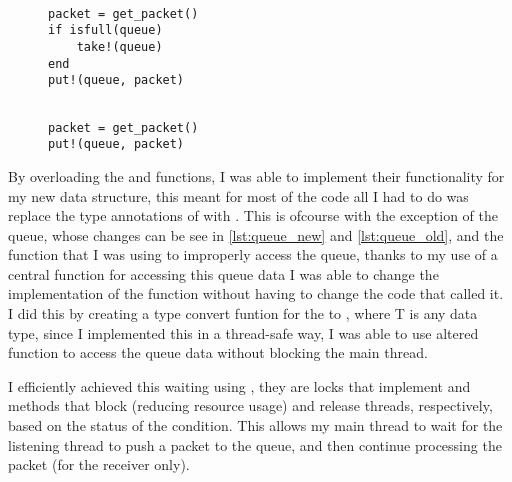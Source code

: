 \begin{figure}[!h]
    \begin{minipage}{0.5\textwidth}
        \centering
        \begin{verbatim}

packet = get_packet()
if isfull(queue)
    take!(queue)
end
put!(queue, packet)

        \end{verbatim}
    \end{minipage}
    \begin{minipage}{0.5\textwidth}
        \centering
        \begin{verbatim}

packet = get_packet()
put!(queue, packet)

        \end{verbatim}
    \end{minipage}
\label{lst:queue_impl_comparison}
\end{figure}

By overloading the  and  functions, I was able to implement their functionality for my new data structure, this meant for most of the code all I had to do was replace the type annotations of  with . This is ofcourse with the exception of the queue, whose changes can be see in \ref{lst:queue_new} and \ref{lst:queue_old}, and the  function that I was using to improperly access the queue, thanks to my use of a central function for accessing this queue data I was able to change the implementation of the function without having to change the code that called it. I did this by creating a type convert funtion for the  to , where T is any data type, since I implemented this in a thread-safe way, I was able to use altered  function to access the queue data without blocking the main thread.

I efficiently achieved this waiting using , they are locks that implement  and  methods that block (reducing resource usage) and release threads, respectively, based on the status of the condition. This allows my main thread to wait for the listening thread to push a packet to the queue, and then continue processing the packet (for the receiver only).

